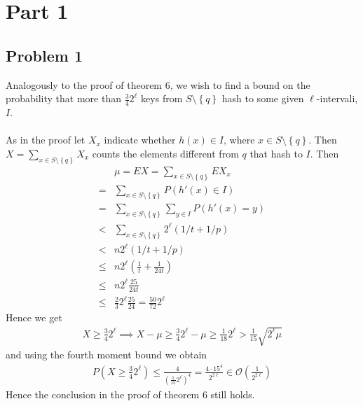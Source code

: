 \section*{Part 1}
\subsection*{Problem 1}
Analogously to the proof of theorem 6,
we wish to find a bound on the probability that more than $\frac{3}{4}2^{\ell}$ 
keys from $S \setminus \left\{ q \right\}$ hash to some given $\ell$-intervali, $I$. \\ \\
As in the proof let $X_x$ indicate whether $h(x) \in I$, where $x \in S \setminus \left\{ q \right\}$. 
Then $X=\sum_{x \in S \setminus \left\{ q \right\}}^{}X_x$ counts the elements different from $q$ that hash to $I$. Then
\begin{align*}
	&\mu=EX=\sum_{x \in S \setminus \left\{ q \right\}}^{}EX_x \\
	=&\sum_{x \in S \setminus \left\{ q \right\}} P(h'(x)  \in I) \\
	=&\sum_{x \in S \setminus \left\{ q \right\}} \sum_{y \in I}^{}P\left( h'(x) =y \right) \\
	<&\sum_{x \in S \setminus \left\{ q \right\}}2^{\ell}\left( 1/t+1/p \right) \\
	<& n 2^{\ell}\left( 1/t+1/p \right) \\
	\leq & n2^{\ell} \left( \frac{1}{t}+\frac{1}{24t} \right) \\
	\leq & n 2^{\ell} \frac{25}{24t} \\
	\leq & \frac{2}{3}2^{\ell} \frac{25}{24} = \frac{50}{72}2^{\ell}
\end{align*}
Hence we get
\begin{align*}
	X \geq \frac{3}{4}2^{\ell} \implies X-\mu \geq \frac{3}{4}2^{\ell}-\mu \geq \frac{1}{18}2^{\ell} >\frac{1}{15}\sqrt{2^{\ell}\mu}
\end{align*}
and using the fourth moment bound we obtain
\begin{align*}
	P\left( X \geq \frac{3}{4}2^{\ell} \right) \leq \frac{4}{\left( \frac{1}{15}2^{\ell}\right)^4} 
	= \frac{4 \cdot 15^4}{2^{2\ell}} \in \mathcal{O}\left( \frac{1}{2^{2 \ell}} \right)
\end{align*}
Hence the conclusion in the proof of theorem 6 still holds.

